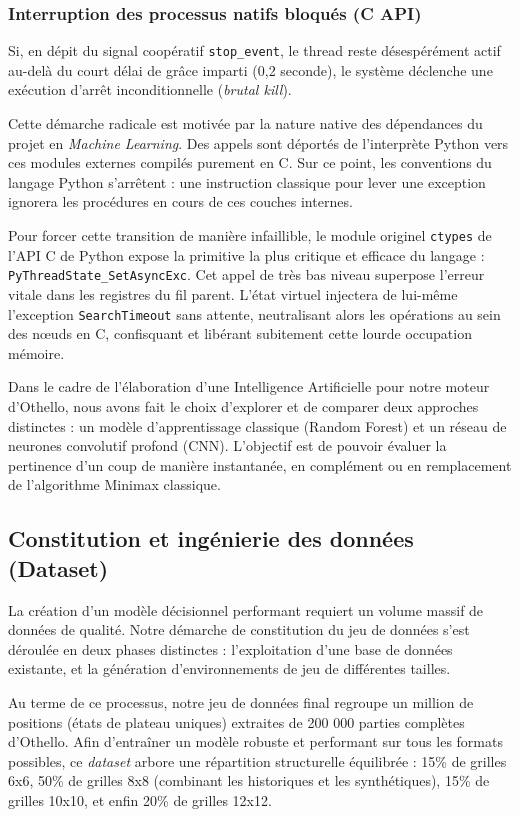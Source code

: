 \documentclass[a4paper]{article}
\begin{document}
\subsubsection*{Interruption des processus natifs bloqués (C API)}

Si, en dépit du signal coopératif \texttt{stop\_event}, le thread reste désespérément actif au-delà du court délai de grâce imparti (0,2 seconde), le système déclenche une exécution d'arrêt inconditionnelle (\textit{brutal kill}).

Cette démarche radicale est motivée par la nature native des dépendances du projet en \textit{Machine Learning}. Des appels sont déportés de l'interprète Python vers ces modules externes compilés purement en C. Sur ce point, les conventions du langage Python s'arrêtent : une instruction classique pour lever une exception ignorera les procédures en cours de ces couches internes.

Pour forcer cette transition de manière infaillible, le module originel \texttt{ctypes} de l'API C de Python expose la primitive la plus critique et efficace du langage : \texttt{PyThreadState\_SetAsyncExc}. Cet appel de très bas niveau superpose l'erreur vitale dans les registres du fil parent. L'état virtuel injectera de lui-même l'exception \texttt{SearchTimeout} sans attente, neutralisant alors les opérations au sein des nœuds en C, confisquant et libérant subitement cette lourde occupation mémoire.

Dans le cadre de l'élaboration d'une Intelligence Artificielle pour notre moteur d'Othello, nous avons fait le choix d'explorer et de comparer deux approches distinctes : un modèle d'apprentissage classique (Random Forest) et un réseau de neurones convolutif profond (CNN). L'objectif est de pouvoir évaluer la pertinence d'un coup de manière instantanée, en complément ou en remplacement de l'algorithme Minimax classique.

\subsection{Constitution et ingénierie des données (Dataset)}

La création d'un modèle décisionnel performant requiert un volume massif de données de qualité. Notre démarche de constitution du jeu de données s'est déroulée en deux phases distinctes : l'exploitation d'une base de données existante, et la génération d'environnements de jeu de différentes tailles.

Au terme de ce processus, notre jeu de données final regroupe un million de positions (états de plateau uniques) extraites de 200 000 parties complètes d'Othello. Afin d'entraîner un modèle robuste et performant sur tous les formats possibles, ce \textit{dataset} arbore une répartition structurelle équilibrée : 15\% de grilles 6x6, 50\% de grilles 8x8 (combinant les historiques et les synthétiques), 15\% de grilles 10x10, et enfin 20\% de grilles 12x12.
\end{document}
